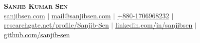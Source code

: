 
\begin{center}
    \textbf{\huge \scshape Sanjib Kumar Sen} \\ \vspace{1pt}
    \scriptsize
    \href{https://sanjibsen.com}{\underline{sanjibsen.com}} $|$
    \href{mailto:mail@sanjibsen.com}{\underline{mail@sanjibsen.com}} $|$
    \href{tel:+8801706968232}{+880-1706968232} $|$
    \href{https://researchgate.net/profile/Sanjib-Sen}{\underline{researchgate.net/profile/Sanjib-Sen}} $|$
    \href{https://linkedin.com/in/sanjibsen}{\underline{linkedin.com/in/sanjibsen}} $|$
    \href{https://github.com/sanjib-sen}{\underline{github.com/sanjib-sen}}
\end{center}



